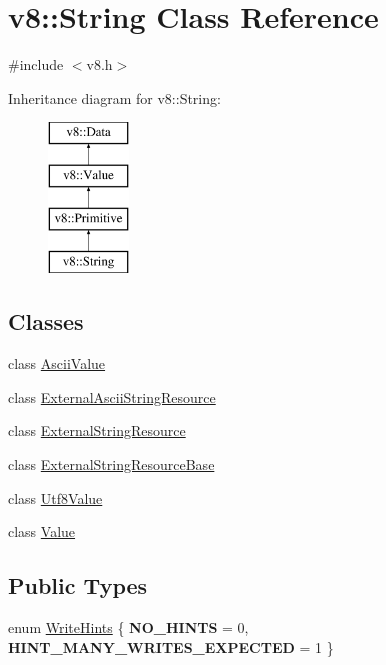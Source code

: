 \hypertarget{classv8_1_1_string}{}\section{v8\+:\+:String Class Reference}
\label{classv8_1_1_string}


{\ttfamily \#include $<$v8.\+h$>$}

Inheritance diagram for v8\+:\+:String\+:\begin{figure}[H]
\begin{center}
\leavevmode
\includegraphics[height=4.000000cm]{classv8_1_1_string}
\end{center}
\end{figure}
\subsection*{Classes}
\begin{DoxyCompactItemize}
\item 
class \hyperlink{classv8_1_1_string_1_1_ascii_value}{Ascii\+Value}
\item 
class \hyperlink{classv8_1_1_string_1_1_external_ascii_string_resource}{External\+Ascii\+String\+Resource}
\item 
class \hyperlink{classv8_1_1_string_1_1_external_string_resource}{External\+String\+Resource}
\item 
class \hyperlink{classv8_1_1_string_1_1_external_string_resource_base}{External\+String\+Resource\+Base}
\item 
class \hyperlink{classv8_1_1_string_1_1_utf8_value}{Utf8\+Value}
\item 
class \hyperlink{classv8_1_1_string_1_1_value}{Value}
\end{DoxyCompactItemize}
\subsection*{Public Types}
\begin{DoxyCompactItemize}
\item 
enum \hyperlink{classv8_1_1_string_a7f9e89f3314177022a47f2ddac7fcb6f}{Write\+Hints} \{ {\bfseries N\+O\+\_\+\+H\+I\+N\+T\+S} = 0, 
{\bfseries H\+I\+N\+T\+\_\+\+M\+A\+N\+Y\+\_\+\+W\+R\+I\+T\+E\+S\+\_\+\+E\+X\+P\+E\+C\+T\+E\+D} = 1
 \}
\end{DoxyCompactItemize}
